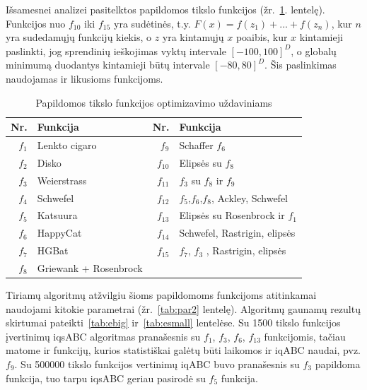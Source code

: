 \documentclass{VUMIFKompMagistrinis}
\begin{document}
Išsamesnei analizei pasitelktos papildomos tikslo funkcijos \cite{CLZ14} (žr.~\ref{tab:extra}. lentelę). Funkcijos nuo $f_{10}$ iki $f_{15}$ yra sudėtinės, t.y. $F(x)=f(z_{1})+...+f(z_{n})$, kur $n$ yra sudedamųjų funkcijų kiekis, o $z$ yra kintamųjų $x$ poaibis, kur $x$ kintamieji paslinkti, jog sprendinių ieškojimas vyktų intervale $[-100,100]^{D}$, o globalų minimumą duodantys kintamieji būtų intervale $[-80,80]^{D}$. Šis paslinkimas naudojamas ir likusioms funkcijoms. 

\begin{table}[H]
\centering
\caption{Papildomos tikslo funkcijos optimizavimo uždaviniams}
\label{tab:extra}
\begin{tabular}{r|l|r|l}
Nr.&Funk\-ci\-ja&Nr.&Funk\-ci\-ja\\
\hline
$f_{1}$ & Lenkto cigaro   &$f_{9}$ & Schaffer $f_6$\\
$f_{2}$ & Disko           &$f_{10}$ & Elipsės su $f_8$\\
$f_{3}$ & Weierstrass     &$f_{11}$ & $f_3$ su $f_8$ ir $f_9$ \\
$f_{4}$ & Schwefel        &$f_{12}$ & $f_5$,$f_6$,$f_8$, Ackley, Schwefel\\
$f_{5}$ & Katsuura       &$f_{13}$ & Elipsės su Rosenbrock ir $f_1$\\
$f_{6}$ & HappyCat      &$f_{14}$ & Schwefel, Rastrigin, elipsės\\
$f_{7}$ & HGBat       &$f_{15}$ & $f_7$, $f_3$ , Rastrigin, elipsės \\
$f_{8}$ & Griewank + Rosenbrock    &&

\end{tabular}
\end{table}


Tiriamų algoritmų atžvilgiu šioms papildomoms funkcijoms atitinkamai naudojami kitokie parametrai (žr.~\ref{tab:par2} lentelę). Algoritmų gaunamų rezultų skirtumai pateikti~\ref{tab:ebig} ir~\ref{tab:esmall} lentelėse. Su 1500 tikslo funkcijos įvertinimų iqsABC algoritmas pranašesnis su $f_{1}$, $f_{3}$, $f_{6}$, $f_{13}$ funkcijomis, tačiau matome ir funkcijų, kurios statistiškai galėtų būti laikomos ir iqABC naudai, pvz. $f_{9}$.  Su 500000 tikslo funkcijos vertinimų iqABC buvo pranašesnis su $f_{3}$ papildoma funkcija, tuo tarpu iqsABC geriau pasirodė su $f_{5}$ funkcija.
\end{document}
